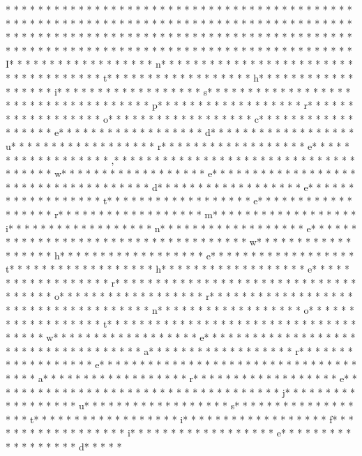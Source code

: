 * * *  * * *  * * *  *  * * *  *  * * *  * * *  * * *  *  * * *  *  * * *  * * *  * * *  *  * * *  *  * * *  *  * * *  * * *  * * *  *  * * *  *  * * *  *  * * *  * * *  * * *  *  * * *  *  * * *  *  * * *  * * *  * * *  *  * * *  *  * * *  *  * * *  * * *  * * *  *  * * *  *  * * *  *  * * *  * * *  * * *  *  * * *  *  * * *  *  * * *  * * *  * * *  *  * * *  *  * * *  *  * * *  * * *  * * *  *  * * *  *  * * *  * I* * *  * * *  * * *  *  * * *  *  * * *  * n* * *  * * *  * * *  *  * * *  *  * * *  *  * * *  * * *  * * *  *  * * *  *  * * *  * t* * *  * * *  * * *  *  * * *  *  * * *  * h* * *  * * *  * * *  *  * * *  *  * * *  * i* * *  * * *  * * *  *  * * *  *  * * *  * s* * *  * * *  * * *  *  * * *  *  * * *  *  * * *  * * *  * * *  *  * * *  *  * * *  * p* * *  * * *  * * *  *  * * *  *  * * *  * r* * *  * * *  * * *  *  * * *  *  * * *  * o* * *  * * *  * * *  *  * * *  *  * * *  * c* * *  * * *  * * *  *  * * *  *  * * *  * e* * *  * * *  * * *  *  * * *  *  * * *  * d* * *  * * *  * * *  *  * * *  *  * * *  * u* * *  * * *  * * *  *  * * *  *  * * *  * r* * *  * * *  * * *  *  * * *  *  * * *  * e* * *  * * *  * * *  *  * * *  *  * * *  * ,* * *  * * *  * * *  *  * * *  *  * * *  *  * * *  * * *  * * *  *  * * *  *  * * *  * w* * *  * * *  * * *  *  * * *  *  * * *  * e* * *  * * *  * * *  *  * * *  *  * * *  *  * * *  * * *  * * *  *  * * *  *  * * *  * d* * *  * * *  * * *  *  * * *  *  * * *  * e* * *  * * *  * * *  *  * * *  *  * * *  * t* * *  * * *  * * *  *  * * *  *  * * *  * e* * *  * * *  * * *  *  * * *  *  * * *  * r* * *  * * *  * * *  *  * * *  *  * * *  * m* * *  * * *  * * *  *  * * *  *  * * *  * i* * *  * * *  * * *  *  * * *  *  * * *  * n* * *  * * *  * * *  *  * * *  *  * * *  * e* * *  * * *  * * *  *  * * *  *  * * *  *  * * *  * * *  * * *  *  * * *  *  * * *  * w* * *  * * *  * * *  *  * * *  *  * * *  * h* * *  * * *  * * *  *  * * *  *  * * *  * e* * *  * * *  * * *  *  * * *  *  * * *  * t* * *  * * *  * * *  *  * * *  *  * * *  * h* * *  * * *  * * *  *  * * *  *  * * *  * e* * *  * * *  * * *  *  * * *  *  * * *  * r* * *  * * *  * * *  *  * * *  *  * * *  *  * * *  * * *  * * *  *  * * *  *  * * *  * o* * *  * * *  * * *  *  * * *  *  * * *  * r* * *  * * *  * * *  *  * * *  *  * * *  *  * * *  * * *  * * *  *  * * *  *  * * *  * n* * *  * * *  * * *  *  * * *  *  * * *  * o* * *  * * *  * * *  *  * * *  *  * * *  * t* * *  * * *  * * *  *  * * *  *  * * *  *  * * *  * * *  * * *  *  * * *  *  * * *  * w* * *  * * *  * * *  *  * * *  *  * * *  * e* * *  * * *  * * *  *  * * *  *  * * *  *  * * *  * * *  * * *  *  * * *  *  * * *  * a* * *  * * *  * * *  *  * * *  *  * * *  * r* * *  * * *  * * *  *  * * *  *  * * *  * e* * *  * * *  * * *  *  * * *  *  * * *  *  * * *  * * *  * * *  *  * * *  *  * * *  * a* * *  * * *  * * *  *  * * *  *  * * *  * r* * *  * * *  * * *  *  * * *  *  * * *  * e* * *  * * *  * * *  *  * * *  *  * * *  *  * * *  * * *  * * *  *  * * *  *  * * *  * j* * *  * * *  * * *  *  * * *  *  * * *  * u* * *  * * *  * * *  *  * * *  *  * * *  * s* * *  * * *  * * *  *  * * *  *  * * *  * t* * *  * * *  * * *  *  * * *  *  * * *  * i* * *  * * *  * * *  *  * * *  *  * * *  * f* * *  * * *  * * *  *  * * *  *  * * *  * i* * *  * * *  * * *  *  * * *  *  * * *  * e* * *  * * *  * * *  *  * * *  *  * * *  * d* * *  * * 